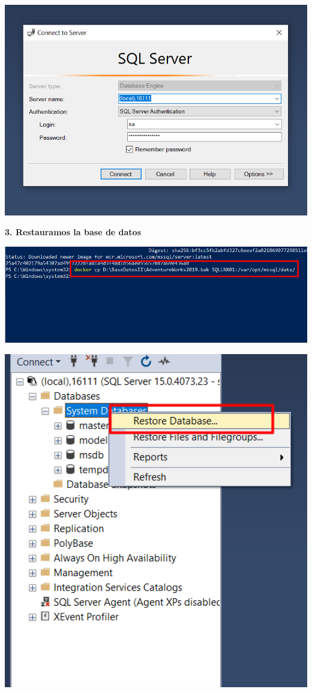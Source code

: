 \documentclass{article}
\begin{document}
    \begin{center}
		\includegraphics[width=15cm]{./images/2} 
	\end{center}
  \newpage
\textbf{3. Restauramos la base de datos}

    \begin{center}
		\includegraphics[width=15cm]{./images/3} 
	\end{center}
	
    \begin{center}
		\includegraphics[width=15cm]{./images/4} 
	\end{center}
	
\end{document}
